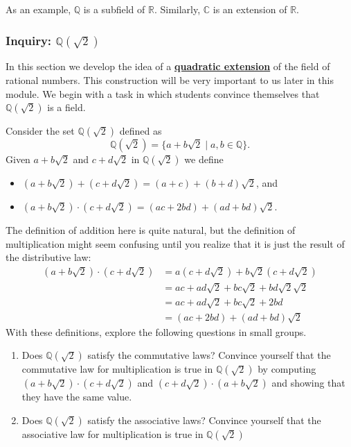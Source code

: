 \documentclass[11pt]{article}
\newenvironment{task}
	{\begin{mdframed}[linecolor=lightgray, linewidth=3pt]\raggedright}
	{\end{mdframed}}
\renewcommand\emph[1]{\underline{\bf{#1}}} %
\theoremstyle{definition}
\begin{document}
As an example, $\mathbb{Q}$ is a subfield of $\mathbb{R}$. Similarly, $\mathbb{C}$ is an extension of $\mathbb{R}$.

\subsubsection{Inquiry: $\mathbb{Q}(\sqrt{2})$}

In this section we develop the idea of a \emph{quadratic extension} of the field of rational numbers. This construction will be very important to us
later in this module. We begin with a task in which students convince themselves that $\mathbb{Q}(\sqrt{2})$ is a field.

\begin{task}

  Consider the set $\mathbb{Q}(\sqrt{2})$ defined as
  \[ \mathbb{Q}(\sqrt{2}) = \{ a + b\sqrt{2} \mid a, b\in \mathbb{Q}\}. \]
  Given $a+b\sqrt{2}$ and $c+d\sqrt{2}$ in $\mathbb{Q}(\sqrt{2})$ we define
  \begin{itemize}
    \item $(a+b\sqrt{2})+(c+d\sqrt{2}) = (a+c) + (b+d)\sqrt{2}$, and
    \item $(a+b\sqrt{2})\cdot (c+d\sqrt{2}) = (ac + 2bd) + (ad +bd)\sqrt{2}$.
  \end{itemize}
  The definition of addition here is quite natural, but the definition of multiplication might seem confusing until you realize that it is just
  the result of the distributive law:
  \begin{align*}
    (a+b\sqrt{2})\cdot (c+d\sqrt{2}) &= a(c+d\sqrt{2}) + b\sqrt{2}(c+d\sqrt{2})\\
                                     &= ac + ad\sqrt{2} + bc\sqrt{2} + bd \sqrt{2}\sqrt{2}\\
                                     &= ac + ad\sqrt{2} + bc\sqrt{2} + 2bd\\
                                     &= (ac + 2bd) + (ad +bd)\sqrt{2}
  \end{align*}
  With these definitions, explore the following questions in small groups.
  \begin{enumerate}
    \item Does $\mathbb{Q}(\sqrt{2})$ satisfy the commutative laws? Convince yourself that the commutative law for multiplication is true in $\mathbb{Q}(\sqrt{2})$
      by computing $(a+b\sqrt{2})\cdot (c+d\sqrt{2})$ and $(c+d\sqrt{2})\cdot (a+b\sqrt{2})$ and showing that they have the same value.
    \item Does $\mathbb{Q}(\sqrt{2})$ satisfy the associative laws? Convince yourself that the associative law for multiplication is true in $\mathbb{Q}(\sqrt{2})$

\end{enumerate}
\end{task}
\end{document}
